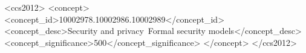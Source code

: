 \documentclass[utf8,acmsmall,review,screen,dvipsnames]{acmart}
\begin{document}
\begin{abstract}



\begin{center}\small\it
	{This paper uses syntax highlighting accessible to both colourblind and black \& white readers~\citep{patrignani2020use}.
	Specifically, it makes use of a $\src{blue}$, $\src{sans\text{-}serif}$ font for a $\src{source}$,
	a $\trg{red}$, $\trg{bold}$ font for an $\trg{intermediate}$,
	and a $\obj{green}$, $\obj{teletype}$ font for a $\obj{target}$ language.
	}
\end{center}
\end{abstract}

\begin{CCSXML}
<ccs2012>
  <concept>
  <concept_id>10002978.10002986.10002989</concept_id>
  <concept_desc>Security and privacy~Formal security models</concept_desc>
  <concept_significance>500</concept_significance>
  </concept>
</ccs2012>
\end{CCSXML}

\end{document}
